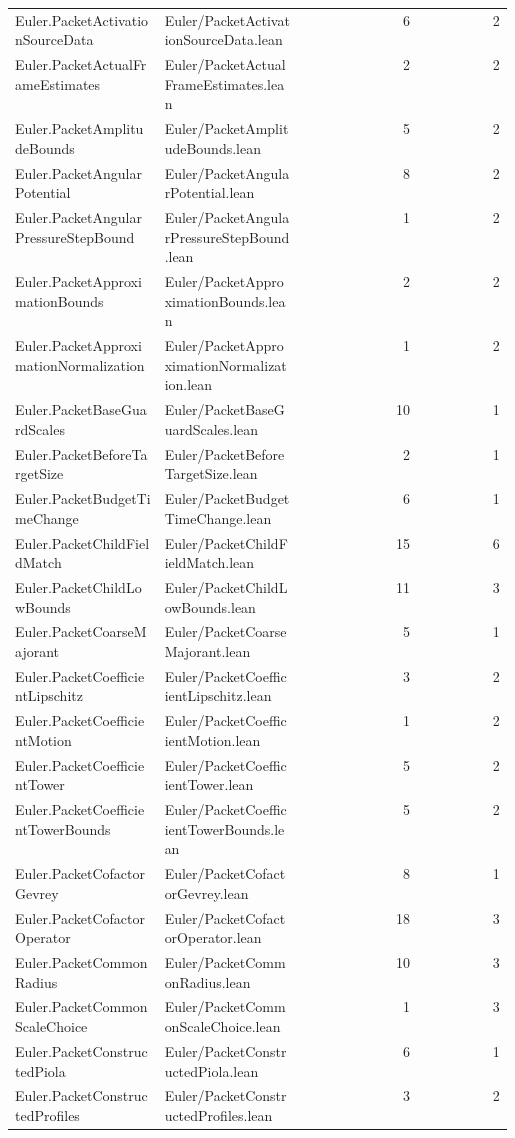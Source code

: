 \begin{longtable}{p{0.30\linewidth}p{0.28\linewidth}rr}
Euler.PacketActivationSourceData & Euler/PacketActivationSourceData.lean & 6 & 2\\
Euler.PacketActualFrameEstimates & Euler/PacketActualFrameEstimates.lean & 2 & 2\\
Euler.PacketAmplitudeBounds & Euler/PacketAmplitudeBounds.lean & 5 & 2\\
Euler.PacketAngularPotential & Euler/PacketAngularPotential.lean & 8 & 2\\
Euler.PacketAngularPressureStepBound & Euler/PacketAngularPressureStepBound.lean & 1 & 2\\
Euler.PacketApproximationBounds & Euler/PacketApproximationBounds.lean & 2 & 2\\
Euler.PacketApproximationNormalization & Euler/PacketApproximationNormalization.lean & 1 & 2\\
Euler.PacketBaseGuardScales & Euler/PacketBaseGuardScales.lean & 10 & 1\\
Euler.PacketBeforeTargetSize & Euler/PacketBeforeTargetSize.lean & 2 & 1\\
Euler.PacketBudgetTimeChange & Euler/PacketBudgetTimeChange.lean & 6 & 1\\
Euler.PacketChildFieldMatch & Euler/PacketChildFieldMatch.lean & 15 & 6\\
Euler.PacketChildLowBounds & Euler/PacketChildLowBounds.lean & 11 & 3\\
Euler.PacketCoarseMajorant & Euler/PacketCoarseMajorant.lean & 5 & 1\\
Euler.PacketCoefficientLipschitz & Euler/PacketCoefficientLipschitz.lean & 3 & 2\\
Euler.PacketCoefficientMotion & Euler/PacketCoefficientMotion.lean & 1 & 2\\
Euler.PacketCoefficientTower & Euler/PacketCoefficientTower.lean & 5 & 2\\
Euler.PacketCoefficientTowerBounds & Euler/PacketCoefficientTowerBounds.lean & 5 & 2\\
Euler.PacketCofactorGevrey & Euler/PacketCofactorGevrey.lean & 8 & 1\\
Euler.PacketCofactorOperator & Euler/PacketCofactorOperator.lean & 18 & 3\\
Euler.PacketCommonRadius & Euler/PacketCommonRadius.lean & 10 & 3\\
Euler.PacketCommonScaleChoice & Euler/PacketCommonScaleChoice.lean & 1 & 3\\
Euler.PacketConstructedPiola & Euler/PacketConstructedPiola.lean & 6 & 1\\
Euler.PacketConstructedProfiles & Euler/PacketConstructedProfiles.lean & 3 & 2\\

\end{longtable}
